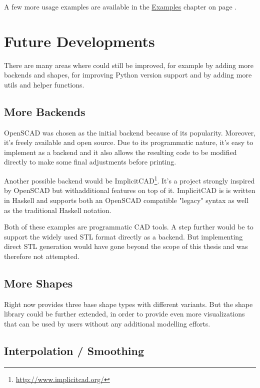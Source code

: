 \noindent A few more usage examples are available in the
\hyperref[ch:examples]{Examples} chapter on page \pageref{ch:examples}.


\section{Future Developments}\label{sec:features:future}

There are many areas where \tangible{} could still be improved, for example by
adding more backends and shapes, for improving Python version support and by
adding more utils and helper functions.

\subsection{More Backends}

OpenSCAD was chosen as the initial backend because of its popularity. Moreover,
it's freely available and open source. Due to its programmatic nature, it's easy
to implement as a backend and it also allows the resulting code to be modified
directly to make some final adjustments before printing.

Another possible backend would be
ImplicitCAD\footnote{\url{http://www.implicitcad.org/}}. It's a project strongly
inspired by OpenSCAD but withadditional features on top of it. ImplicitCAD is is
written in Haskell and supports both an OpenSCAD compatible "legacy" syntax as
well as the traditional Haskell notation.

Both of these examples are programmatic CAD tools. A step further would be to
support the widely used STL format directly as a backend. But implementing
direct STL generation would have gone beyond the scope of this thesis and was
therefore not attempted.

\subsection{More Shapes}

Right now \tangible{} provides three base shape types with different variants.
But the shape library could be further extended, in order to provide even more
visualizations that can be used by users without any additional modelling
efforts.

\subsection{Interpolation / Smoothing}

